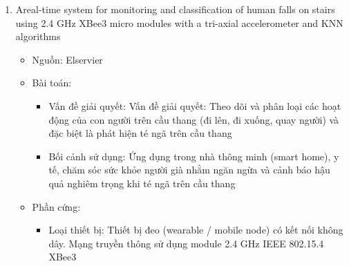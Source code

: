 \documentclass[../DoAn.tex]{subfiles}
\begin{document}
\begin{enumerate}[label=\arabic*)]
\begin{itemize}
\begin{itemize}
            \item Kiến trúc module của HMM hỗ trợ khả năng diễn giải và mở rộng trong thời gian thực cho các hệ thống giám sát y tế
        \end{itemize}
        \item Nhược điểm:
        \begin{itemize}
            \item Quá trình lựa chọn đặc trưng bằng CSO yêu cầu phải huấn luyện chéo (3-fold cross-validation) mô hình Random Forest qua nhiều vòng lặp, dẫn đến chi phí tính toán ở pha huấn luyện (training phase) rất lớn. Pha tối ưu hóa (CSO) và huấn luyện HMM bằng thuật toán Baum-Welch.cực kỳ tốn tài nguyên và bắt buộc phải chạy offline trên máy tính hoặc Cloud server.
            \item Tập dữ liệu gốc KFall cung cấp cả dữ liệu từ kế (magnetometer), nhưng nghiên cứu này đã loại bỏ hoàn toàn cảm biến này, có khả năng lãng phí một số thông tin quan trọng về góc định hướng của cơ thể
            \item Việc sử dụng cửa sổ cố định 200 mẫu có thể gây ra một độ trễ nhỏ khi ứng dụng vào hệ thống cảnh báo tức thời cực kỳ khắt khe
        \end{itemize}
         tắt:
    \end{itemize}
    \item Areal-time system for monitoring and classification of human falls on stairs using 2.4 GHz XBee3 micro modules with a tri-axial accelerometer and KNN algorithms
    \begin{itemize}
        \item Nguồn: Elservier
        \item Bài toán:
        \begin{itemize}
            \item Vấn đề giải quyết: Vấn đề giải quyết: Theo dõi và phân loại các hoạt động của con người trên cầu thang (đi lên, đi xuống, quay người) và đặc biệt là phát hiện té ngã trên cầu thang
            \item Bối cảnh sử dụng: Ứng dụng trong nhà thông minh (smart home), y tế, chăm sóc sức khỏe người già nhằm ngăn ngừa và cảnh báo hậu quả nghiêm trọng khi té ngã trên cầu thang
        \end{itemize}
        \item Phần cứng: 
        \begin{itemize}
            \item Loại thiết bị: Thiết bị đeo (wearable / mobile node) có kết nối không dây. Mạng truyền thông sử dụng module 2.4 GHz IEEE 802.15.4 XBee3

\end{itemize}
\end{itemize}
\end{enumerate}
\end{document}
